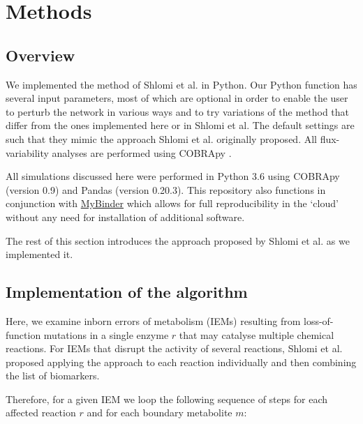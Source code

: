 \documentclass[10pt,a4paper,onecolumn]{article}
\begin{document}
\section{Methods}\label{methods}

\subsection{Overview}\label{overview}

We implemented the method of Shlomi et al. in Python. Our Python
function has several input parameters, most of which are optional in
order to enable the user to perturb the network in various ways and to
try variations of the method that differ from the ones implemented here
or in Shlomi et al. The default settings are such that they mimic the
approach Shlomi et al. originally proposed. All flux-variability
analyses are performed using COBRApy \autocite{Ebrahim2013}.

All simulations discussed here were performed in Python 3.6 using
COBRApy \autocite{Ebrahim2013} (version 0.9) and Pandas (version
0.20.3). This repository also functions in conjunction with
\href{http://mybinder.org}{MyBinder} which allows for full
reproducibility in the `cloud' without any need for installation of
additional software.

The rest of this section introduces the approach proposed by Shlomi et
al. as we implemented it.

\subsection{Implementation of the
algorithm}\label{implementation-of-the-algorithm}

Here, we examine inborn errors of metabolism (IEMs) resulting from
loss-of-function mutations in a single enzyme \(r\) that may catalyse
multiple chemical reactions. For IEMs that disrupt the activity of
several reactions, Shlomi et al. proposed applying the approach to each
reaction individually and then combining the list of biomarkers.

Therefore, for a given IEM we loop the following sequence of steps for
each affected reaction \(r\) and for each boundary metabolite \(m\):
\end{document}
